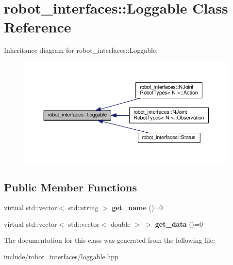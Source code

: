 \hypertarget{classrobot__interfaces_1_1Loggable}{}\section{robot\+\_\+interfaces\+:\+:Loggable Class Reference}
\label{classrobot__interfaces_1_1Loggable}


Inheritance diagram for robot\+\_\+interfaces\+:\+:Loggable\+:
\nopagebreak
\begin{figure}[H]
\begin{center}
\leavevmode
\includegraphics[width=350pt]{classrobot__interfaces_1_1Loggable__inherit__graph}
\end{center}
\end{figure}
\subsection*{Public Member Functions}
\begin{DoxyCompactItemize}
\item 
virtual std\+::vector$<$ std\+::string $>$ {\bfseries get\+\_\+name} ()=0\hypertarget{classrobot__interfaces_1_1Loggable_a19635ebc166379f11fe4c8e58153243a}{}\label{classrobot__interfaces_1_1Loggable_a19635ebc166379f11fe4c8e58153243a}

\item 
virtual std\+::vector$<$ std\+::vector$<$ double $>$ $>$ {\bfseries get\+\_\+data} ()=0\hypertarget{classrobot__interfaces_1_1Loggable_a28ffee45cf66a84d16b2c907ed10367c}{}\label{classrobot__interfaces_1_1Loggable_a28ffee45cf66a84d16b2c907ed10367c}

\end{DoxyCompactItemize}


The documentation for this class was generated from the following file\+:\begin{DoxyCompactItemize}
\item 
include/robot\+\_\+interfaces/loggable.\+hpp\end{DoxyCompactItemize}
